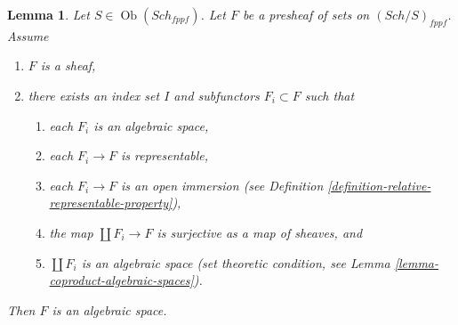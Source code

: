 \documentclass{stacks-project}
\theoremstyle{plain}
\newtheorem{lemma}[subsection]{Lemma}
\theoremstyle{definition}
\theoremstyle{remark}
\numberwithin{equation}{subsection}
\def\Sch{\mathit{Sch}}
\def\Ob{\mathop{\mathrm{Ob}}\nolimits}
\begin{document}
\begin{lemma}
\label{lemma-glueing-algebraic-spaces}
Let $S \in \Ob(\Sch_{fppf})$.
Let $F$ be a presheaf of sets on $(\Sch/S)_{fppf}$.
Assume
\begin{enumerate}
\item $F$ is a sheaf,
\item there exists an index set $I$
and subfunctors $F_i \subset F$ such that
\begin{enumerate}
\item each $F_i$ is an algebraic space,
\item each $F_i \to F$ is representable,
\item each $F_i \to F$ is an open immersion (see
Definition \ref{definition-relative-representable-property}),
\item the map $\coprod F_i \to F$ is surjective as a map of sheaves, and
\item $\coprod F_i$ is an algebraic space (set theoretic condition, see
Lemma \ref{lemma-coproduct-algebraic-spaces}).
\end{enumerate}
\end{enumerate}
Then $F$ is an algebraic space.
\end{lemma}
\end{document}

